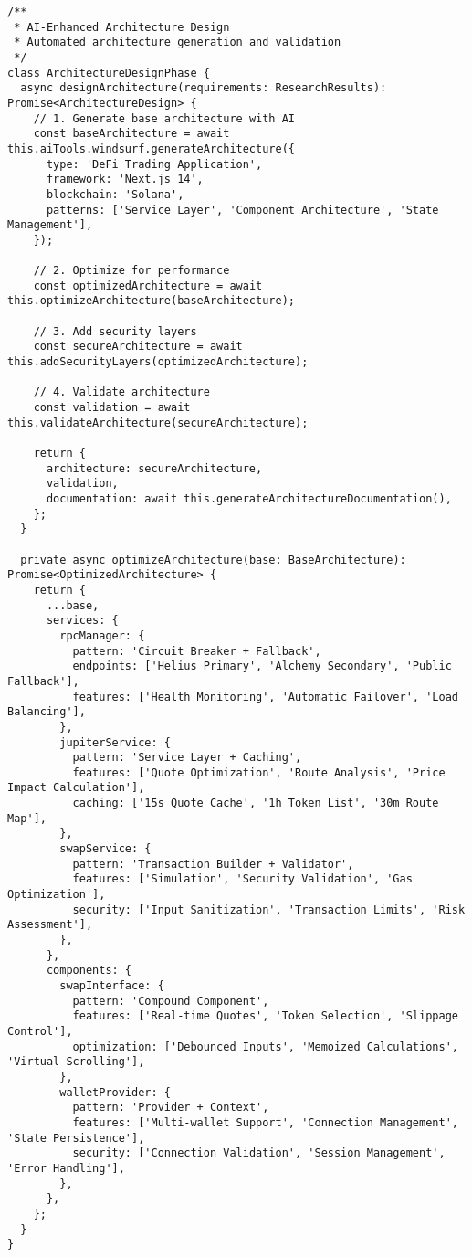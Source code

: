 \documentclass[11pt,a4paper]{article}
\begin{document}
\begin{lstlisting}[style=typescript, caption=Architecture Design Automation]
/**
 * AI-Enhanced Architecture Design
 * Automated architecture generation and validation
 */
class ArchitectureDesignPhase {
  async designArchitecture(requirements: ResearchResults): Promise<ArchitectureDesign> {
    // 1. Generate base architecture with AI
    const baseArchitecture = await this.aiTools.windsurf.generateArchitecture({
      type: 'DeFi Trading Application',
      framework: 'Next.js 14',
      blockchain: 'Solana',
      patterns: ['Service Layer', 'Component Architecture', 'State Management'],
    });

    // 2. Optimize for performance
    const optimizedArchitecture = await this.optimizeArchitecture(baseArchitecture);

    // 3. Add security layers
    const secureArchitecture = await this.addSecurityLayers(optimizedArchitecture);

    // 4. Validate architecture
    const validation = await this.validateArchitecture(secureArchitecture);

    return {
      architecture: secureArchitecture,
      validation,
      documentation: await this.generateArchitectureDocumentation(),
    };
  }

  private async optimizeArchitecture(base: BaseArchitecture): Promise<OptimizedArchitecture> {
    return {
      ...base,
      services: {
        rpcManager: {
          pattern: 'Circuit Breaker + Fallback',
          endpoints: ['Helius Primary', 'Alchemy Secondary', 'Public Fallback'],
          features: ['Health Monitoring', 'Automatic Failover', 'Load Balancing'],
        },
        jupiterService: {
          pattern: 'Service Layer + Caching',
          features: ['Quote Optimization', 'Route Analysis', 'Price Impact Calculation'],
          caching: ['15s Quote Cache', '1h Token List', '30m Route Map'],
        },
        swapService: {
          pattern: 'Transaction Builder + Validator',
          features: ['Simulation', 'Security Validation', 'Gas Optimization'],
          security: ['Input Sanitization', 'Transaction Limits', 'Risk Assessment'],
        },
      },
      components: {
        swapInterface: {
          pattern: 'Compound Component',
          features: ['Real-time Quotes', 'Token Selection', 'Slippage Control'],
          optimization: ['Debounced Inputs', 'Memoized Calculations', 'Virtual Scrolling'],
        },
        walletProvider: {
          pattern: 'Provider + Context',
          features: ['Multi-wallet Support', 'Connection Management', 'State Persistence'],
          security: ['Connection Validation', 'Session Management', 'Error Handling'],
        },
      },
    };
  }
}
\end{lstlisting}
\end{document}
